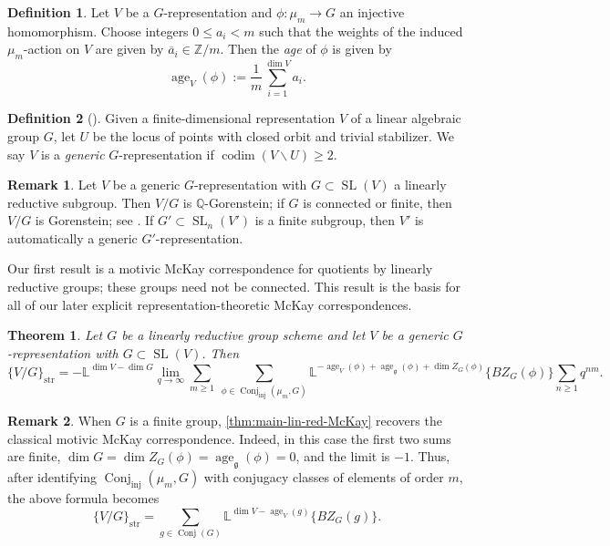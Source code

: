 \documentclass[12pt,a4paper]{amsart}
\newtheorem{theorem}{Theorem}
\theoremstyle{definition}
\newtheorem{definition}[definition]{Definition}
\newtheorem{remark}[remark]{Remark}
\renewcommand{\setminus}{\smallsetminus}
\newcommand{\ZZ}{\mathbb{Z}}
\newcommand{\QQ}{\mathbb{Q}}
\newcommand{\bL}{\mathbb{L}}
\newcommand{\g}{\mathfrak{g}}
\newcommand{\str}{\mathrm{str}}
\renewcommand{\1}{\textbf{1}}
\newcommand{\<}{\langle}
\renewcommand{\>}{\rangle}
\DeclareMathOperator{\codim}{codim}
\DeclareMathOperator{\age}{age}
\DeclareMathOperator{\SL}{SL}
\DeclareMathOperator{\Conj}{Conj}
\DeclareMathOperator{\inj}{inj}
\begin{document}
\begin{definition}\label{def:age}
Let $V$ be a $G$-representation and $\phi\colon\mu_m\to G$ an injective homomorphism. Choose integers $0\leq a_i<m$ such that the weights of the induced $\mu_m$-action on $V$ are given by $\overline{a}_i\in\ZZ/m$. Then the \emph{age} of $\phi$ is given by
\[
    \age_V(\phi):=\frac{1}{m}\sum_{i=1}^{\dim V} a_i.
\]
\end{definition}


\begin{definition}[{\cite[Definition 1.6]{SpenkoVanDenBergh17}}]
\label{def:generic-G-rep}
Given a finite-dimensional representation $V$ of a linear algebraic group $G$, let $U$ be the locus of points with closed orbit and trivial stabilizer. We say $V$ is a \emph{generic} $G$-representation if $\codim(V\setminus U)\geq2$.
\end{definition}

\begin{remark}
Let $V$ be a generic $G$-representation with $G\subset\SL(V)$ a linearly reductive subgroup. Then $V/G$ is $\QQ$-Gorenstein; if $G$ is connected or finite, then $V/G$ is Gorenstein; see \cite[Proposition 10.4]{SatrianoUsatine4}. If $G'\subset\SL_n(V')$ is a finite subgroup, then $V'$ is automatically a generic $G'$-representation.
\end{remark}



Our first result is a motivic McKay correspondence for quotients by linearly reductive groups; these groups need not be connected. This result is the basis for all of our later explicit representation-theoretic McKay correspondences.

\begin{theorem}\label{thm:main-lin-red-McKay}
Let $G$ be a linearly reductive group scheme and let $V$ be a generic $G$-representation with $G\subset\SL(V)$. Then
\[
	\{V/G\}_{\str}=-\bL^{\dim V-\dim G}\lim_{q\to\infty}\sum_{m\ge1}\ \sum_{\phi\in\Conj_{\inj}(\mu_m,G)} \bL^{-\age_V(\phi)+\age_{\g}(\phi)+\dim Z_G(\phi)}\{BZ_G(\phi)\}\sum_{n\ge1}q^{nm}.
\]
\end{theorem}


\begin{remark}
When $G$ is a finite group, \autoref{thm:main-lin-red-McKay} recovers the classical motivic McKay correspondence. Indeed, in this case the first two sums are finite, $\dim G=\dim Z_G(\phi)=\age_\g(\phi)=0$,
and the limit is $-1$. Thus, after identifying $\Conj_{\inj}(\mu_m,G)$ with conjugacy classes of elements of order $m$, the above formula becomes
\[
	\{V/G\}_{\str}=\sum_{g\in\Conj(G)}\bL^{\dim V-\age_V(g)}\{BZ_G(g)\}.
\]
\end{remark}
\end{document}
